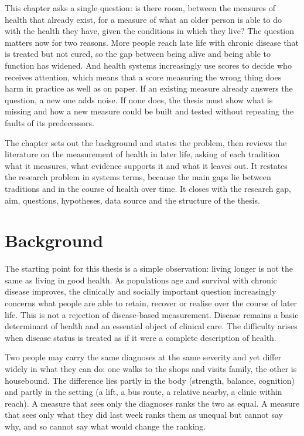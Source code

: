 \label{ch:introduction}

This chapter asks a single question: is there room, between the measures of health that already exist, for a measure of what an older person is able to do with the health they have, given the conditions in which they live? The question matters now for two reasons. More people reach late life with chronic disease that is treated but not cured, so the gap between being alive and being able to function has widened. And health systems increasingly use scores to decide who receives attention, which means that a score measuring the wrong thing does harm in practice as well as on paper. If an existing measure already answers the question, a new one adds noise. If none does, the thesis must show what is missing and how a new measure could be built and tested without repeating the faults of its predecessors.

The chapter sets out the background and states the problem, then reviews the literature on the measurement of health in later life, asking of each tradition what it measures, what evidence supports it and what it leaves out. It restates the research problem in systems terms, because the main gaps lie between traditions and in the course of health over time. It closes with the research gap, aim, questions, hypotheses, data source and the structure of the thesis.

\section{Background}
\label{sec:intro-background}

The starting point for this thesis is a simple observation: living longer is not the same as living in good health. As populations age and survival with chronic disease improves, the clinically and socially important question increasingly concerns what people are able to retain, recover or realise over the course of later life. This is not a rejection of disease-based measurement. Disease remains a basic determinant of health and an essential object of clinical care. The difficulty arises when disease status is treated as if it were a complete description of health.

Two people may carry the same diagnoses at the same severity and yet differ widely in what they can do: one walks to the shops and visits family, the other is housebound. The difference lies partly in the body (strength, balance, cognition) and partly in the setting (a lift, a bus route, a relative nearby, a clinic within reach). A measure that sees only the diagnoses ranks the two as equal. A measure that sees only what they did last week ranks them as unequal but cannot say why, and so cannot say what would change the ranking.

